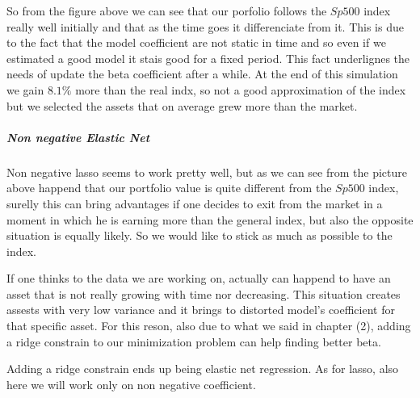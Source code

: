 \documentclass{article}%
\begin{document}
  
   

So from the figure above we can see that our porfolio follows the $Sp500$ index really well initially and that as the time goes it differenciate from it. This is due to the fact that the model coefficient are not static in time and so even if we estimated a good model it stais good for a fixed period. This fact underlignes the needs of update the beta coefficient after a while. At the end of this simulation we gain $8.1\%$ more than the real indx, so not a good approximation of the index but we selected the assets that on average grew more than the market.

\subparagraph{Non negative Elastic Net}
Non negative lasso seems to work pretty well, but as we can see from the picture above happend that our portfolio value is quite different from the $Sp500$ index, surelly this can bring advantages if one decides to exit from the market in a moment in which he is earning more than the general index, but also the opposite situation is equally likely. So we would like to stick as much as possible to the index.

If one thinks to the data we are working on, actually can happend to have an asset that is not really growing with time nor decreasing. This situation creates assests with very low variance and it brings to distorted model's coefficient for that specific asset. For this reson, also due to what we said in chapter (2), adding a ridge constrain to our minimization problem can help finding better beta.

Adding a ridge constrain ends up being elastic net regression. As for lasso, also here we will work only on non negative coefficient.
\\
\end{document}
